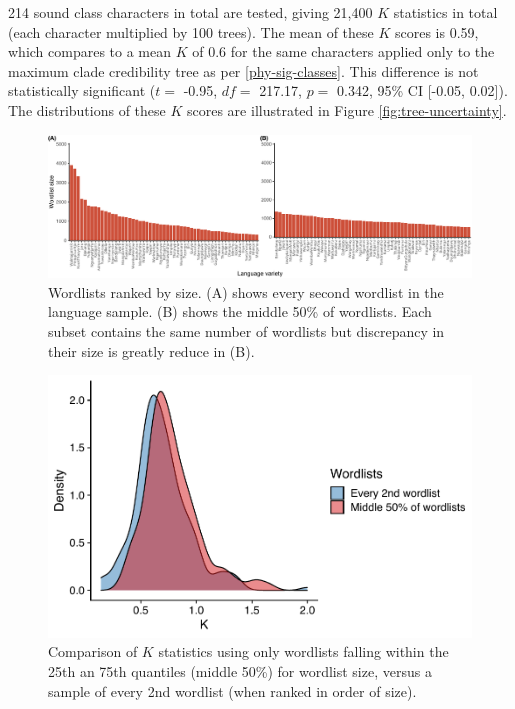214 sound class characters in total are tested, giving 21,400 \(K\) statistics in total (each character multiplied by 100 trees). The mean of these \(K\) scores is 0.59, which compares to a mean \(K\) of 0.6 for the same characters applied only to the maximum clade credibility tree as per \ref{phy-sig-classes}. This difference is not statistically significant (\(t=\) -0.95, \(df=\) 217.17, \(p=\) 0.342, 95\% CI {[}-0.05, 0.02{]}). The distributions of these \(K\) scores are illustrated in Figure \ref{fig:tree-uncertainty}.

\begin{figure}

{\centering \includegraphics[width=1\linewidth]{fig/wordlist_subset_sizes} 

}

\caption{Wordlists ranked by size. (A) shows every second wordlist in the language sample. (B) shows the middle 50\% of wordlists. Each subset contains the same number of wordlists but discrepancy in their size is greatly reduce in (B).}\label{fig:wordlist-subset-sizes}
\end{figure}

\begin{figure}

{\centering \includegraphics[width=0.66\linewidth]{fig/k-IQR-vs-Every2nd} 

}

\caption{Comparison of $K$ statistics using only wordlists falling within the 25th an 75th quantiles (middle 50\%) for wordlist size, versus a sample of every 2nd wordlist (when ranked in order of size).}\label{fig:wordlist-uncertainty}
\end{figure}

